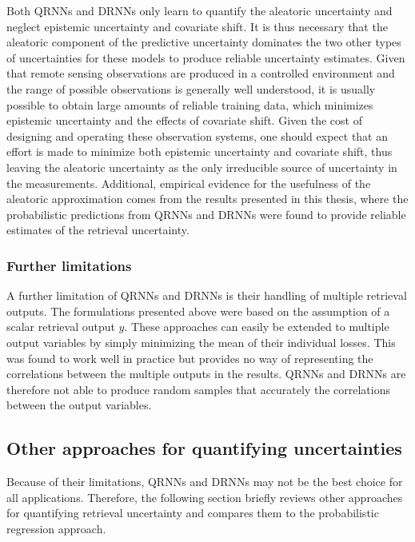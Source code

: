 Both QRNNs and DRNNs only learn to quantify the aleatoric uncertainty and
neglect epistemic uncertainty and covariate shift. It is thus necessary that the
aleatoric component of the predictive uncertainty dominates the two other types
of uncertainties for these models to produce reliable uncertainty estimates.
Given that remote sensing observations are produced in a controlled environment
and the range of possible observations is generally well understood, it is
usually possible to obtain large amounts of reliable training data, which
minimizes epistemic uncertainty and the effects of covariate shift. Given the
cost of designing and operating these observation systems, one should expect
that an effort is made to minimize both epistemic uncertainty and covariate
shift, thus leaving the aleatoric uncertainty as the only irreducible source of
uncertainty in the measurements. Additional, empirical evidence for the
usefulness of the aleatoric approximation comes from the results presented in
this thesis, where the probabilistic predictions from QRNNs and DRNNs were found
to provide reliable estimates of the retrieval uncertainty.

\subsubsection{Further limitations}

A further limitation of QRNNs and DRNNs is their handling of multiple retrieval
outputs. The formulations presented above were based on the assumption of a
scalar retrieval output $y$. These approaches can easily be extended to multiple
output variables by simply minimizing the mean of their individual losses. This
was found to work well in practice but provides no way of representing the
correlations between the multiple outputs in the results. QRNNs and DRNNs are
therefore not able to produce random samples  that accurately the correlations
between the output variables.

\subsection{Other approaches for quantifying uncertainties}

Because of their limitations, QRNNs and DRNNs may not be the best choice for all
applications. Therefore, the following section briefly reviews other approaches
for quantifying retrieval uncertainty and compares them to the probabilistic
regression approach.

